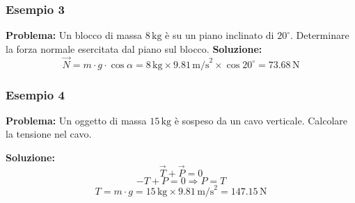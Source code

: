 \documentclass{beamer}
\begin{document}
\begin{frame}
\frametitle{Esempio 3}
\textbf{Problema:} Un blocco di massa $8\,\text{kg}$ è su un piano inclinato di $20^\circ$. Determinare la forza normale esercitata dal piano sul blocco.
\textbf{Soluzione:}
\begin{equation*}
\vec{N} = m \cdot g \cdot \cos{\alpha} = 8\,\text{kg} \times 9.81\,\text{m/s}^2 \times \cos{20^\circ} = 73.68\,\text{N}
\end{equation*}
\end{frame}

\begin{frame}
\frametitle{Esempio 4}
\textbf{Problema:} Un oggetto di massa $15\,\text{kg}$ è sospeso da un cavo verticale. Calcolare la tensione nel cavo.

\textbf{Soluzione:}
\begin{equation*}
\vec{T} + \vec{P} = 0
\end{equation*}
\begin{equation*}
-T + P = 0 \Rightarrow P = T
\end{equation*}
\begin{equation*}
T = m \cdot g = 15\,\text{kg} \times 9.81\,\text{m/s}^2 = 147.15\,\text{N}
\end{equation*}
\end{frame}
\end{document}
